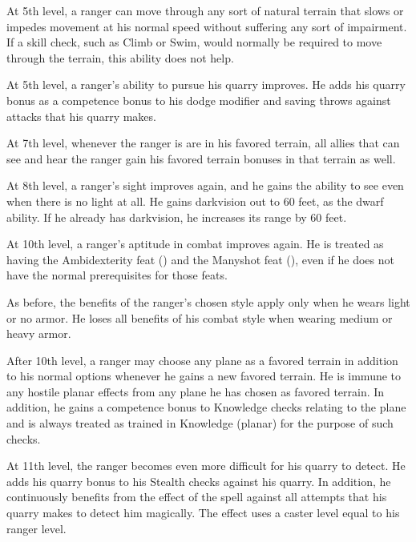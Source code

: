  At 5th level, a ranger can move through any sort of natural terrain that slows or impedes movement at his normal speed without suffering any sort of impairment. If a skill check, such as Climb or Swim, would normally be required to move through the terrain, this ability does not help.

 At 5th level, a ranger's ability to pursue his quarry improves. He adds his quarry bonus as a competence bonus to his dodge modifier and saving throws against attacks that his quarry makes.


 At 7th level, whenever the ranger is are in his favored terrain, all allies that can see and hear the ranger gain his favored terrain bonuses in that terrain as well.

 At 8th level, a ranger's sight improves again, and he gains the ability to see even when there is no light at all. He gains darkvision out to 60 feet, as the dwarf ability. If he already has darkvision, he increases its range by 60 feet.

 At 10th level, a ranger's aptitude in combat improves again. He is treated as having the Ambidexterity feat () and the Manyshot feat (), even if he does not have the normal prerequisites for those feats.
\par As before, the benefits of the ranger's chosen style apply only when he wears light or no armor. He loses all benefits of his combat style when wearing medium or heavy armor.

 After 10th level, a ranger may choose any plane as a favored terrain in addition to his normal options whenever he gains a new favored terrain. He is immune to any hostile planar effects from any plane he has chosen as favored terrain. In addition, he gains a  competence bonus to Knowledge checks relating to the plane and is always treated as trained in Knowledge (planar) for the purpose of such checks.

 At 11th level, the ranger becomes even more difficult for his quarry to detect. He adds his quarry bonus to his Stealth checks against his quarry. In addition, he continuously benefits from the effect of the  spell against all attempts that his quarry makes to detect him magically. The effect uses a caster level equal to his ranger level.

